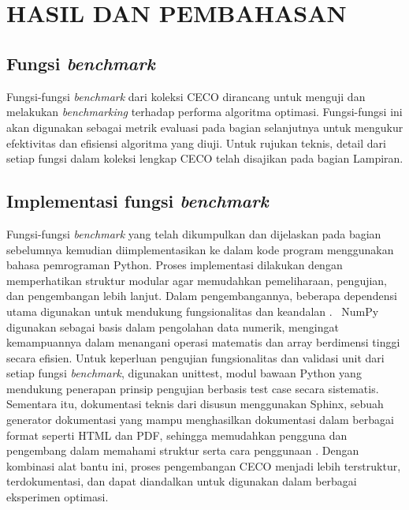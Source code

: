 
\chapter[HASIL DAN PEMBAHASAN]{\\ HASIL DAN PEMBAHASAN}

\section{Fungsi \textit{benchmark}}
Fungsi-fungsi \textit{benchmark} dari koleksi CECO dirancang untuk menguji dan melakukan \textit{benchmarking} terhadap performa algoritma optimasi. Fungsi-fungsi ini akan digunakan sebagai metrik evaluasi pada bagian selanjutnya untuk mengukur efektivitas dan efisiensi algoritma yang diuji. Untuk rujukan teknis, detail dari setiap fungsi dalam koleksi lengkap CECO telah disajikan pada bagian Lampiran.

\section{Implementasi fungsi \textit{benchmark}}
Fungsi-fungsi \textit{benchmark} yang telah dikumpulkan dan dijelaskan pada bagian sebelumnya kemudian diimplementasikan ke dalam kode program menggunakan bahasa pemrograman Python. Proses implementasi dilakukan dengan memperhatikan struktur modular agar memudahkan pemeliharaan, pengujian, dan pengembangan lebih lanjut. Dalam pengembangannya, beberapa dependensi utama digunakan untuk mendukung fungsionalitas dan keandalan .\  NumPy digunakan sebagai basis dalam pengolahan data numerik, mengingat kemampuannya dalam menangani operasi matematis dan array berdimensi tinggi secara efisien. Untuk keperluan pengujian fungsionalitas dan validasi unit dari setiap fungsi \textit{benchmark}, digunakan unittest, modul bawaan Python yang mendukung penerapan prinsip pengujian berbasis test case secara sistematis. Sementara itu, dokumentasi teknis dari  disusun menggunakan Sphinx, sebuah generator dokumentasi yang mampu menghasilkan dokumentasi dalam berbagai format seperti HTML dan PDF, sehingga memudahkan pengguna dan pengembang dalam memahami struktur serta cara penggunaan . Dengan kombinasi alat bantu ini, proses pengembangan  CECO menjadi lebih terstruktur, terdokumentasi, dan dapat diandalkan untuk digunakan dalam berbagai eksperimen optimasi.

